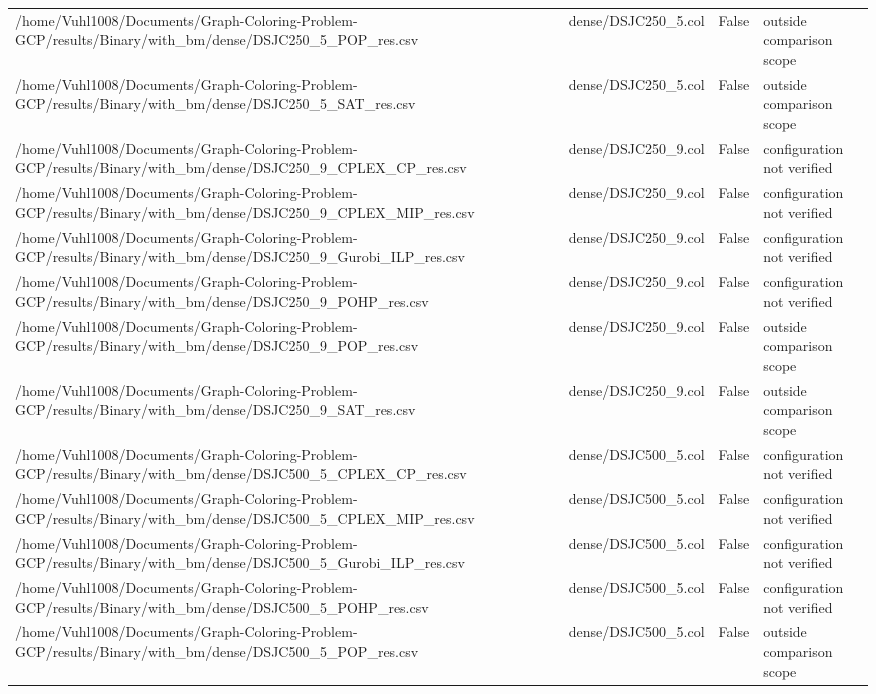 \begin{table}[htbp]
\begin{tabular}{llll}
/home/Vuhl1008/Documents/Graph-Coloring-Problem-GCP/results/Binary/with\_bm/dense/DSJC250\_5\_POP\_res.csv & dense/DSJC250\_5.col & False & outside comparison scope \\
/home/Vuhl1008/Documents/Graph-Coloring-Problem-GCP/results/Binary/with\_bm/dense/DSJC250\_5\_SAT\_res.csv & dense/DSJC250\_5.col & False & outside comparison scope \\
/home/Vuhl1008/Documents/Graph-Coloring-Problem-GCP/results/Binary/with\_bm/dense/DSJC250\_9\_CPLEX\_CP\_res.csv & dense/DSJC250\_9.col & False & configuration not verified \\
/home/Vuhl1008/Documents/Graph-Coloring-Problem-GCP/results/Binary/with\_bm/dense/DSJC250\_9\_CPLEX\_MIP\_res.csv & dense/DSJC250\_9.col & False & configuration not verified \\
/home/Vuhl1008/Documents/Graph-Coloring-Problem-GCP/results/Binary/with\_bm/dense/DSJC250\_9\_Gurobi\_ILP\_res.csv & dense/DSJC250\_9.col & False & configuration not verified \\
/home/Vuhl1008/Documents/Graph-Coloring-Problem-GCP/results/Binary/with\_bm/dense/DSJC250\_9\_POHP\_res.csv & dense/DSJC250\_9.col & False & configuration not verified \\
/home/Vuhl1008/Documents/Graph-Coloring-Problem-GCP/results/Binary/with\_bm/dense/DSJC250\_9\_POP\_res.csv & dense/DSJC250\_9.col & False & outside comparison scope \\
/home/Vuhl1008/Documents/Graph-Coloring-Problem-GCP/results/Binary/with\_bm/dense/DSJC250\_9\_SAT\_res.csv & dense/DSJC250\_9.col & False & outside comparison scope \\
/home/Vuhl1008/Documents/Graph-Coloring-Problem-GCP/results/Binary/with\_bm/dense/DSJC500\_5\_CPLEX\_CP\_res.csv & dense/DSJC500\_5.col & False & configuration not verified \\
/home/Vuhl1008/Documents/Graph-Coloring-Problem-GCP/results/Binary/with\_bm/dense/DSJC500\_5\_CPLEX\_MIP\_res.csv & dense/DSJC500\_5.col & False & configuration not verified \\
/home/Vuhl1008/Documents/Graph-Coloring-Problem-GCP/results/Binary/with\_bm/dense/DSJC500\_5\_Gurobi\_ILP\_res.csv & dense/DSJC500\_5.col & False & configuration not verified \\
/home/Vuhl1008/Documents/Graph-Coloring-Problem-GCP/results/Binary/with\_bm/dense/DSJC500\_5\_POHP\_res.csv & dense/DSJC500\_5.col & False & configuration not verified \\
/home/Vuhl1008/Documents/Graph-Coloring-Problem-GCP/results/Binary/with\_bm/dense/DSJC500\_5\_POP\_res.csv & dense/DSJC500\_5.col & False & outside comparison scope \\

\end{tabular}
\end{table}
